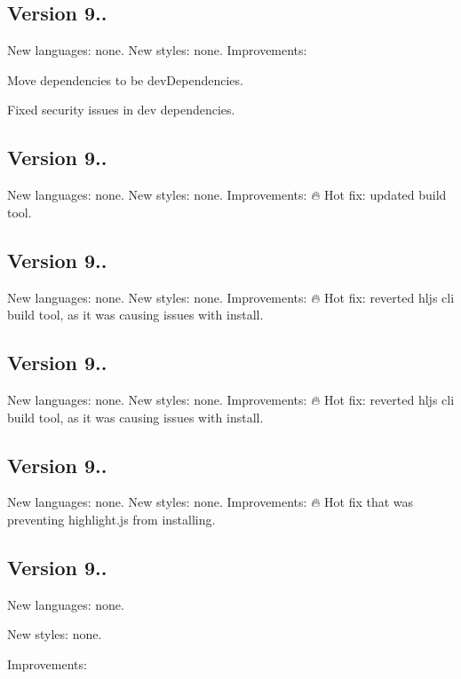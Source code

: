 \subsection*{Version 9..}

New languages\+: none. New styles\+: none. Improvements\+:
\begin{DoxyItemize}
\item Move dependencies to be dev\+Dependencies.
\item Fixed security issues in dev dependencies.
\end{DoxyItemize}

\subsection*{Version 9..}

New languages\+: none. New styles\+: none. Improvements\+: 🔥 Hot fix\+: updated build tool.

\subsection*{Version 9..}

New languages\+: none. New styles\+: none. Improvements\+: 🔥 Hot fix\+: reverted hljs cli build tool, as it was causing issues with install.

\subsection*{Version 9..}

New languages\+: none. New styles\+: none. Improvements\+: 🔥 Hot fix\+: reverted hljs cli build tool, as it was causing issues with install.

\subsection*{Version 9..}

New languages\+: none. New styles\+: none. Improvements\+: 🔥 Hot fix that was preventing highlight.\+js from installing.

\subsection*{Version 9..}

New languages\+: none.

New styles\+: none.

Improvements\+:


